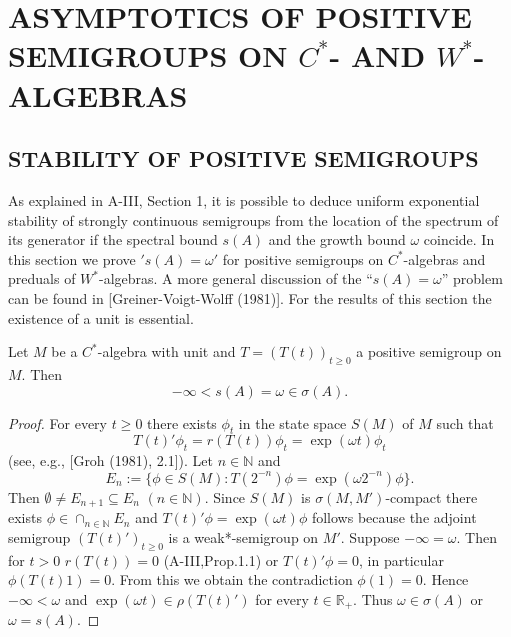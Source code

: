 

\chapter{ASYMPTOTICS OF POSITIVE SEMIGROUPS ON $C^*$- AND $W^*$-ALGEBRAS}

\section{STABILITY OF POSITIVE SEMIGROUPS}

As explained in A-III, Section 1, it is possible to deduce uniform exponential stability of strongly continuous semigroups from the location of the spectrum of its generator if the spectral bound $s(A)$ and the growth bound $\omega$ coincide.
In this section we prove $'s(A) = \omega'$ for positive semigroups on $C^*$-algebras and preduals of $W^*$-algebras.
A more general discussion of the \enquote{$s(A) = \omega$} problem can be found in [Greiner-Voigt-Wolff (1981)].
For the results of this section the existence of a unit is essential.

\begin{theorem}\label{thm:d4-1-1}
Let $M$ be a $C^*$-algebra with unit and $T = (T(t))_{t \geq 0}$ a positive semigroup on $M$.
Then
\[
-\infty < s(A) = \omega \in \sigma(A).
\]
\end{theorem}
\begin{proof}
For every $t \geq 0$ there exists $\phi_{t}$ in the state space $S(M)$ of $M$ such that
\[
T(t)'\phi_{t} = r(T(t))\phi_{t} = \exp(\omega t)\phi_{t}
\]
(see, e.g., [Groh (1981), 2.1]).
Let $n \in \mathbb{N}$ and
\[
E_{n} := \{\phi \in S(M) : T(2^{-n})\phi = \exp(\omega 2^{-n})\phi \}.
\]
Then $\emptyset \neq E_{n+1} \subseteq E_{n}$ $(n \in \mathbb{N})$.
Since $S(M)$ is $\sigma(M,M')$-compact there exists $\phi \in \cap_{n \in \mathbb{N}} E_{n}$ and $T(t)'\phi = \exp(\omega t)\phi$ follows because the adjoint semigroup $(T(t)')_{t \geq 0}$ is a weak*-semigroup on $M'$.
Suppose $-\infty = \omega$.
Then for $t > 0$ $r(T(t)) = 0$ (A-III,Prop.1.1) or $T(t)'\phi = 0$, in particular $\phi(T(t)1) = 0$.
From this we obtain the contradiction $\phi(1) = 0$.
Hence $-\infty < \omega$ and $\exp(\omega t) \in \rho(T(t)')$ for every $t \in \mathbb{R}_{+}$.
Thus $\omega \in \sigma(A)$ or $\omega = s(A)$.
\end{proof}


